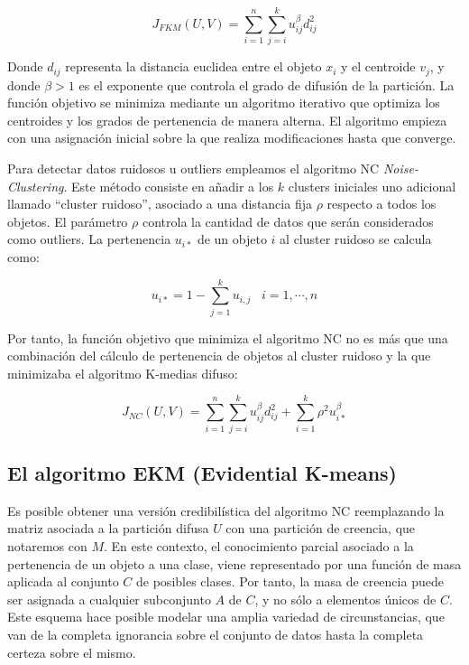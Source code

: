 \begin{equation}
J_{FKM}(U,V) = \sum_{i=1}^{n}\sum_{j=i}^{k} u_{ij}^\beta d_{ij}^2
\label{eqn8}
\end{equation}

Donde $d_{ij}$ representa la distancia euclidea entre el objeto $x_i$ y el centroide $v_j$, y donde $\beta > 1$ es el exponente que controla el grado de difusión de la partición. La función objetivo se minimiza mediante un algoritmo iterativo que optimiza los centroides y los grados de pertenencia de manera alterna. El algoritmo empieza con una asignación inicial sobre la que realiza modificaciones hasta que converge.

Para detectar datos ruidosos u outliers empleamos el algoritmo \acs{NC} \textit{Noise-Clustering}. Este método consiste en añadir a los $k$ clusters iniciales uno adicional llamado ``cluster ruidoso'', asociado a una distancia fija $\rho$ respecto a todos los objetos. El parámetro $\rho$ controla la cantidad de datos que serán considerados como outliers. La pertenencia $u_{i*}$ de un objeto $i$ al cluster ruidoso se calcula como:

\begin{equation}
u_{i*} = 1 - \sum_{j=1}^{k} u_{i,j} \;\;\; i = {1,\cdots,n}
\label{eqn9}
\end{equation}

Por tanto, la función objetivo que minimiza el algoritmo \acs{NC} no es más que una combinación del cálculo de pertenencia de objetos al cluster ruidoso y la que minimizaba el algoritmo K-medias difuso:

\begin{equation}
J_{NC}(U,V) = \sum_{i=1}^{n}\sum_{j=i}^{k} u_{ij}^\beta d_{ij}^2 + \sum_{i=1}^{k} \rho^2 u_{i*}^\beta
\label{eqn10}
\end{equation}

\subsection{El algoritmo EKM (Evidential K-means)}

Es posible obtener una versión credibilística del algoritmo \acs{NC} reemplazando la matriz asociada a la partición difusa $U$ con una partición de creencia, que notaremos con $M$. En este contexto, el conocimiento parcial asociado a la pertenencia de un objeto a una clase, viene representado por una función de masa aplicada al conjunto $C$ de posibles clases. Por tanto, la masa de creencia puede ser asignada a cualquier subconjunto $A$ de $C$, y no sólo a elementos únicos de $C$. Este esquema hace posible modelar una amplia variedad de circunstancias, que van de la completa ignorancia sobre el conjunto de datos hasta la completa certeza sobre el mismo.

